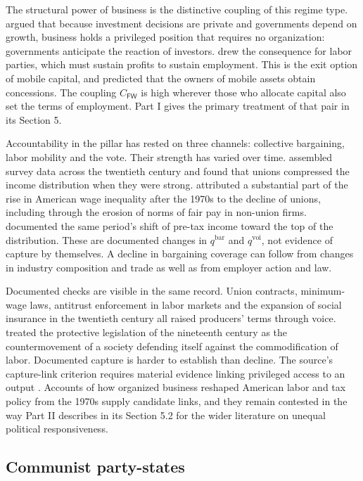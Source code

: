 \documentclass[11pt,letterpaper]{article}
\theoremstyle{definition}
\theoremstyle{remark}
\newcommand{\pF}{\mathsf{F}}
\newcommand{\pW}{\mathsf{W}}
\begin{document}
The structural power of business is the distinctive coupling of this regime type. \citet{lindblom1977} argued that because investment decisions are private and governments depend on growth, business holds a privileged position that requires no organization: governments anticipate the reaction of investors. \citet{przeworski1985} drew the consequence for labor parties, which must sustain profits to sustain employment. This is the exit option of mobile capital, and \citet{bates1985} predicted that the owners of mobile assets obtain concessions. The coupling $C_{\pF\pW}$ is high wherever those who allocate capital also set the terms of employment. Part I gives the primary treatment of that pair in its Section 5.

Accountability in the pillar has rested on three channels: collective bargaining, labor mobility and the vote. Their strength has varied over time. \citet{farber2021} assembled survey data across the twentieth century and found that unions compressed the income distribution when they were strong. \citet{western2011} attributed a substantial part of the rise in American wage inequality after the 1970s to the decline of unions, including through the erosion of norms of fair pay in non-union firms. \citet{piketty2018} documented the same period's shift of pre-tax income toward the top of the distribution. These are documented changes in $q^{\mathrm{bar}}$ and $q^{\mathrm{voi}}$, not evidence of capture by themselves. A decline in bargaining coverage can follow from changes in industry composition and trade as well as from employer action and law.

Documented checks are visible in the same record. Union contracts, minimum-wage laws, antitrust enforcement in labor markets and the expansion of social insurance in the twentieth century all raised producers' terms through voice. \citet{polanyi1944} treated the protective legislation of the nineteenth century as the countermovement of a society defending itself against the commodification of labor. Documented capture is harder to establish than decline. The source's capture-link criterion requires material evidence linking privileged access to an output \citep{largo2026hbs}. Accounts of how organized business reshaped American labor and tax policy from the 1970s \citep{hackerpierson2010} supply candidate links, and they remain contested in the way Part II \citep{long2026political} describes in its Section 5.2 for the wider literature on unequal political responsiveness.

\subsection{Communist party-states}
\end{document}
